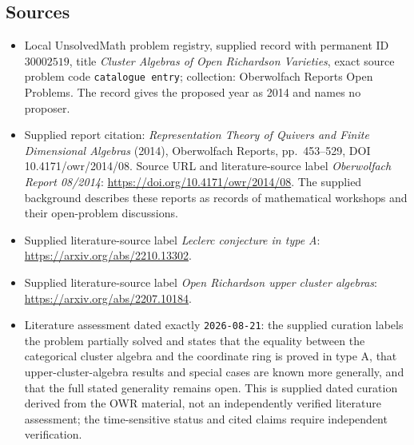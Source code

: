 \documentclass[11pt]{article}
\begin{document}
\subsection{Sources}
\begin{itemize}
\item Local UnsolvedMath problem registry, supplied record with permanent ID \(30002519\), title \emph{Cluster Algebras of Open Richardson Varieties}, exact source problem code \texttt{catalogue entry}; collection: Oberwolfach Reports Open Problems. The record gives the proposed year as 2014 and names no proposer.
\item Supplied report citation: \emph{Representation Theory of Quivers and Finite Dimensional Algebras} (2014), Oberwolfach Reports, pp.~453--529, DOI 10.4171/owr/2014/08. Source URL and literature-source label \emph{Oberwolfach Report 08/2014}: \url{https://doi.org/10.4171/owr/2014/08}. The supplied background describes these reports as records of mathematical workshops and their open-problem discussions.
\item Supplied literature-source label \emph{Leclerc conjecture in type A}: \url{https://arxiv.org/abs/2210.13302}.
\item Supplied literature-source label \emph{Open Richardson upper cluster algebras}: \url{https://arxiv.org/abs/2207.10184}.
\item Literature assessment dated exactly \texttt{2026-08-21}: the supplied curation labels the problem partially solved and states that the equality between the categorical cluster algebra and the coordinate ring is proved in type A, that upper-cluster-algebra results and special cases are known more generally, and that the full stated generality remains open. This is supplied dated curation derived from the OWR material, not an independently verified literature assessment; the time-sensitive status and cited claims require independent verification.
\end{itemize}
\end{document}
